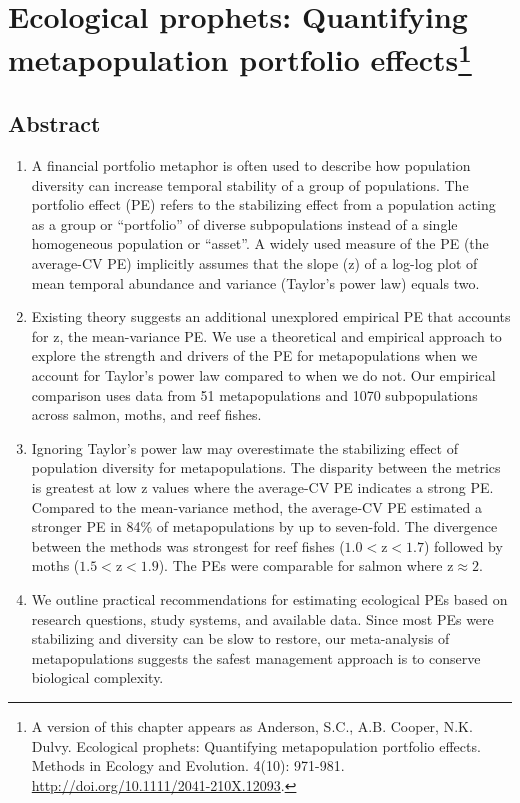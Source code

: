 \chapter[Quantifying metapopulation portfolio effects]{Ecological
  prophets: Quantifying metapopulation portfolio effects\footnote{A version
    of this chapter appears as Anderson, S.C., A.B. Cooper, N.K. Dulvy.
    Ecological prophets: Quantifying metapopulation portfolio effects. Methods
    in Ecology and Evolution. 4(10): 971-981.
    \url{http://doi.org/10.1111/2041-210X.12093}.}}

\section{Abstract}
\begin{enumerate}
 \item A financial portfolio metaphor is often used to describe how population
   diversity can increase temporal stability of a group of populations. The
   portfolio effect (PE) refers to the stabilizing effect from a population
   acting as a group or ``portfolio'' of diverse subpopulations instead of a
   single homogeneous population or ``asset''. A widely used measure of the PE
   (the average-CV PE) implicitly assumes that the slope (z) of a log-log plot
   of mean temporal abundance and variance (Taylor's power law) equals two.

 \item Existing theory suggests an additional unexplored empirical PE that
   accounts for z, the mean-variance PE. We use a theoretical and empirical
   approach to explore the strength and drivers of the PE for metapopulations
   when we account for Taylor's power law compared to when we do not. Our
   empirical comparison uses data from 51 metapopulations and
   1070 subpopulations across salmon, moths, and reef fishes.

 \item Ignoring Taylor's power law may overestimate the stabilizing effect of
   population diversity for metapopulations. The disparity between the metrics
   is greatest at low z values where the average-CV PE indicates a strong PE.
   Compared to the mean-variance method, the average-CV PE estimated a stronger
   PE in 84\% of metapopulations by up to seven-fold. The divergence between
   the methods was strongest for reef fishes ($1.0 < \text{z} < 1.7$) followed
   by moths ($1.5 < \text{z} < 1.9$). The PEs were comparable for salmon where
   $\text{z} \approx 2$.

 \item We outline practical recommendations for estimating ecological PEs based
   on research questions, study systems, and available data. Since most PEs
   were stabilizing and diversity can be slow to restore, our meta-analysis of
   metapopulations suggests the safest management approach is to conserve
   biological complexity.

\end{enumerate}

